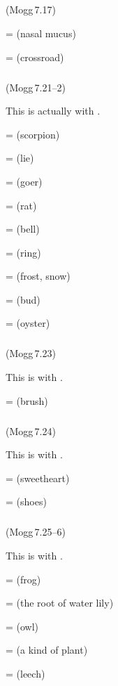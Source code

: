 \subparagraph*{} (Mogg\,7.17)\label{pacckx:aadnika}\label{pacckx:aadtaka}

 =  (nasal mucus)\par
{} =  (crossroad)\par

\subparagraph*{} (Mogg\,7.21--2)\label{pacckx:kika}

This is actually  with .

 =  (scorpion)\par
{} =  (lie)\par
{} =  (goer)\par
{} =  (rat)\par
{} =  (bell)\par
{} =  (ring)\par
{} =  (frost, snow)\par
{} =  (bud)\par
{} =  (oyster)\par

\subparagraph*{} (Mogg\,7.23)\label{pacckx:kiika}

This is  with .

 =  (brush)\par

\subparagraph*{} (Mogg\,7.24)\label{pacckx:dnuka}

This is  with .

 =  (sweetheart)\par
{} =  (shoes)\par

\subparagraph*{} (Mogg\,7.25--6)\label{pacckx:dnuuka}

This is  with .

 =  (frog)\par
{} =  (the root of water lily)\par
{} =  (owl)\par
{} =  (a kind of plant)\par
{} =  (leech)\par

